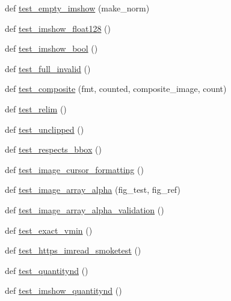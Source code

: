 \begin{DoxyCompactItemize}
\item 
def \hyperlink{namespacematplotlib_1_1tests_1_1test__image_a3af2ee0c126ffcd8c54146da5df66a03}{test\+\_\+empty\+\_\+imshow} (make\+\_\+norm)
\item 
def \hyperlink{namespacematplotlib_1_1tests_1_1test__image_a2a884d4a011a9b2b74421265bd3befbb}{test\+\_\+imshow\+\_\+float128} ()
\item 
def \hyperlink{namespacematplotlib_1_1tests_1_1test__image_a8e467631116df7e3a862406d6db55c8c}{test\+\_\+imshow\+\_\+bool} ()
\item 
def \hyperlink{namespacematplotlib_1_1tests_1_1test__image_a8206452e13f0230c8a60fa3e12db149d}{test\+\_\+full\+\_\+invalid} ()
\item 
def \hyperlink{namespacematplotlib_1_1tests_1_1test__image_ab4ac21624b12b6efe1babf9ecc9b5c54}{test\+\_\+composite} (fmt, counted, composite\+\_\+image, count)
\item 
def \hyperlink{namespacematplotlib_1_1tests_1_1test__image_a059421e5af801186dc321907226062ae}{test\+\_\+relim} ()
\item 
def \hyperlink{namespacematplotlib_1_1tests_1_1test__image_a887d13287795238f38060d8089156aba}{test\+\_\+unclipped} ()
\item 
def \hyperlink{namespacematplotlib_1_1tests_1_1test__image_aff43c151c9916704a7bec66f06aa7ef3}{test\+\_\+respects\+\_\+bbox} ()
\item 
def \hyperlink{namespacematplotlib_1_1tests_1_1test__image_a64b8f543175e1eba789af6a11e35013c}{test\+\_\+image\+\_\+cursor\+\_\+formatting} ()
\item 
def \hyperlink{namespacematplotlib_1_1tests_1_1test__image_a3adac2883986d823fdbd3ccc8398266f}{test\+\_\+image\+\_\+array\+\_\+alpha} (fig\+\_\+test, fig\+\_\+ref)
\item 
def \hyperlink{namespacematplotlib_1_1tests_1_1test__image_a34ecadb64c4305c749a654a94c8d69b4}{test\+\_\+image\+\_\+array\+\_\+alpha\+\_\+validation} ()
\item 
def \hyperlink{namespacematplotlib_1_1tests_1_1test__image_aedcc052d83906339299ee1d128fc9439}{test\+\_\+exact\+\_\+vmin} ()
\item 
def \hyperlink{namespacematplotlib_1_1tests_1_1test__image_a3022d1fff6c50df93cc5a09553056f90}{test\+\_\+https\+\_\+imread\+\_\+smoketest} ()
\item 
def \hyperlink{namespacematplotlib_1_1tests_1_1test__image_adb0e3f8f8c7dc41aded6eff34ff17c2d}{test\+\_\+quantitynd} ()
\item 
def \hyperlink{namespacematplotlib_1_1tests_1_1test__image_adb45e3853bd3e189fa56dcde68d3d0e2}{test\+\_\+imshow\+\_\+quantitynd} ()

\end{DoxyCompactItemize}
